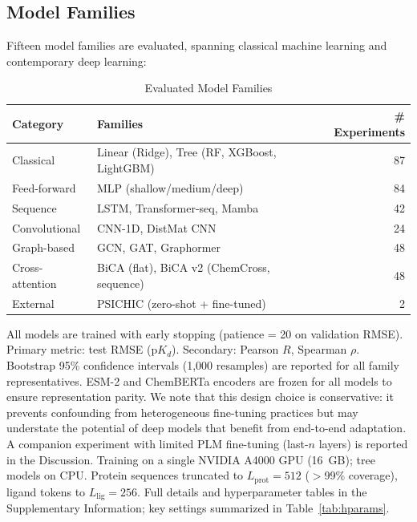 \documentclass[11pt,twocolumn,a4paper]{article}
\begin{document}
\subsection{Model Families}

Fifteen model families are evaluated, spanning classical machine learning and contemporary deep learning:

\begin{table}[t]
\centering
\caption{Evaluated Model Families}
\label{tab:families}
\begin{tabular}{llr}
\toprule
\textbf{Category} & \textbf{Families} & \textbf{\# Experiments} \\
\midrule
Classical & Linear (Ridge), Tree (RF, XGBoost, LightGBM) & 87 \\
Feed-forward & MLP (shallow/medium/deep) & 84 \\
Sequence & LSTM, Transformer-seq, Mamba & 42 \\
Convolutional & CNN-1D, DistMat CNN & 24 \\
Graph-based & GCN, GAT, Graphormer & 48 \\
Cross-attention & BiCA (flat), BiCA v2 (ChemCross, sequence) & 48 \\
External & PSICHIC (zero-shot + fine-tuned) & 2 \\
\bottomrule
\end{tabular}
\end{table}

All models are trained with early stopping (patience = 20 on validation RMSE). Primary metric: test RMSE (p$K_d$). Secondary: Pearson $R$, Spearman $\rho$. Bootstrap 95\% confidence intervals (1,000 resamples) are reported for all family representatives. ESM-2 and ChemBERTa encoders are frozen for all models to ensure representation parity. We note that this design choice is conservative: it prevents confounding from heterogeneous fine-tuning practices but may understate the potential of deep models that benefit from end-to-end adaptation. A companion experiment with limited PLM fine-tuning (last-$n$ layers) is reported in the Discussion. Training on a single NVIDIA A4000 GPU (16~GB); tree models on CPU. Protein sequences truncated to $L_\text{prot}=512$ ($>$99\% coverage), ligand tokens to $L_\text{lig}=256$. Full details and hyperparameter tables in the Supplementary Information; key settings summarized in Table~\ref{tab:hparams}.
\end{document}
